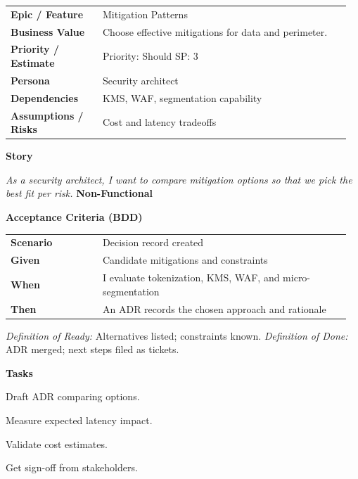 \documentclass[11pt,letterpaper]{article}
\makeatletter
\newenvironment{kvtable}{%
  \begin{tabular}{@{}>{\bfseries\arraybackslash}p{0.26\linewidth} p{0.70\linewidth}@{}}
}{\end{tabular}}
\newenvironment{bdd}{%
  \begin{tabular}{@{}>{\bfseries\arraybackslash}p{0.26\linewidth} p{0.70\linewidth}@{}}
}{\end{tabular}}
\newcommand{\DoRDoD}[2]{%
  \vspace{0.35em}
  {\footnotesize\color{Muted}%
    \textit{Definition of Ready:} #1 \; \textbullet\;
    \textit{Definition of Done:} #2%
  }%
}
\newenvironment{storycard}[2]{%
  \begin{tcolorbox}[cloudcard, title={#1 --- #2}]%
}{\end{tcolorbox}}
\newcommand{\sectionlabel}[1]{\vspace{0.35em}\textbf{#1}\par}
\makeatother
\begin{document}
\begin{storycard}{CCS-9}{Ch. 9 — Risk Mitigation Methods}
\begin{kvtable}
Epic / Feature & Mitigation Patterns\\
Business Value & Choose effective mitigations for data and perimeter.\\
Priority / Estimate & Priority: Should \quad SP: 3\\
Persona & Security architect\\
Dependencies & KMS, WAF, segmentation capability\\
Assumptions / Risks & Cost and latency tradeoffs\\
\end{kvtable}
\sectionlabel{Story}
\textit{As a security architect, I want to compare mitigation options so that we pick the best fit per risk.}
\sectionlabel{Non-Functional}\;
\sectionlabel{Acceptance Criteria (BDD)}
\begin{bdd}
Scenario & Decision record created\\
Given & Candidate mitigations and constraints\\
When & I evaluate tokenization, KMS, WAF, and micro-segmentation\\
Then & An ADR records the chosen approach and rationale\\
\end{bdd}
\DoRDoD{Alternatives listed; constraints known.}{ADR merged; next steps filed as tickets.}
\sectionlabel{Tasks}
\begin{checklist}
\item Draft ADR comparing options.
\item Measure expected latency impact.
\item Validate cost estimates.
\item Get sign-off from stakeholders.
\end{checklist}
\end{storycard}
\end{document}
